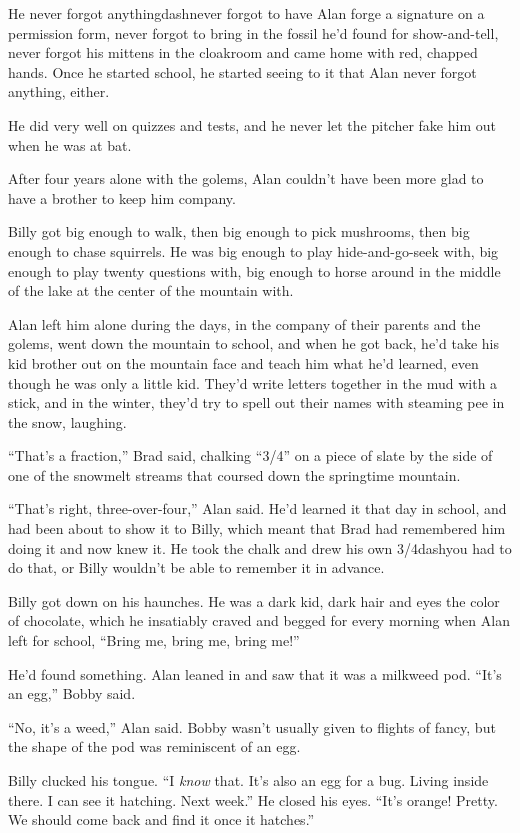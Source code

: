 He never forgot anythingdash{}never forgot to have Alan forge a signature
on a permission form, never forgot to bring in the fossil he'd found
for show-and-tell, never forgot his mittens in the cloakroom and came
home with red, chapped hands.  Once he started school, he started
seeing to it that Alan never forgot anything, either.

He did very well on quizzes and tests, and he never let the pitcher
fake him out when he was at bat.

After four years alone with the golems, Alan couldn't have been more
glad to have a brother to keep him company.

Billy got big enough to walk, then big enough to pick mushrooms, then
big enough to chase squirrels.  He was big enough to play
hide-and-go-seek with, big enough to play twenty questions with, big
enough to horse around in the middle of the lake at the center of the
mountain with.

Alan left him alone during the days, in the company of their parents
and the golems, went down the mountain to school, and when he got
back, he'd take his kid brother out on the mountain face and teach him
what he'd learned, even though he was only a little kid.  They'd write
letters together in the mud with a stick, and in the winter, they'd
try to spell out their names with steaming pee in the snow, laughing.

``That's a fraction,'' Brad said, chalking ``3/4'' on a piece of slate
by the side of one of the snowmelt streams that coursed down the
springtime mountain.

``That's right, three-over-four,'' Alan said.  He'd learned it that
day in school, and had been about to show it to Billy, which meant
that Brad had remembered him doing it and now knew it.  He took the
chalk and drew his own 3/4dash{}you had to do that, or Billy wouldn't be
able to remember it in advance.

Billy got down on his haunches.  He was a dark kid, dark hair and eyes
the color of chocolate, which he insatiably craved and begged for
every morning when Alan left for school, ``Bring me, bring me, bring
me!''

He'd found something.  Alan leaned in and saw that it was a milkweed
pod.  ``It's an egg,'' Bobby said.

``No, it's a weed,'' Alan said.  Bobby wasn't usually given to flights
of fancy, but the shape of the pod was reminiscent of an egg.

Billy clucked his tongue.  ``I \textit{know} that.  It's also an egg
for a bug.  Living inside there.  I can see it hatching.  Next week.''
He closed his eyes.  ``It's orange!  Pretty.  We should come back and
find it once it hatches.''

